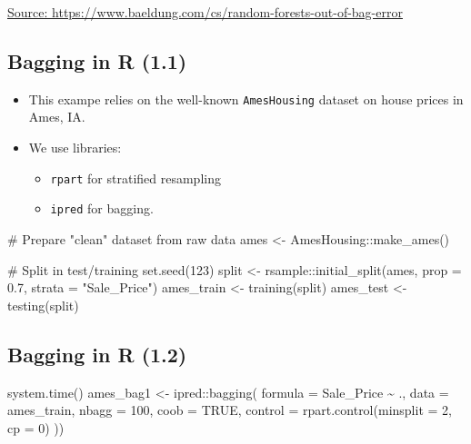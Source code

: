 \documentclass[
  letterpaper,
  DIV=11,
  numbers=noendperiod]{scrartcl}
\newenvironment{Shaded}{\begin{snugshade}}{\end{snugshade}}
\newcommand{\AttributeTok}[1]{\textcolor[rgb]{0.40,0.45,0.13}{#1}}
\newcommand{\CommentTok}[1]{\textcolor[rgb]{0.37,0.37,0.37}{#1}}
\newcommand{\ConstantTok}[1]{\textcolor[rgb]{0.56,0.35,0.01}{#1}}
\newcommand{\DecValTok}[1]{\textcolor[rgb]{0.68,0.00,0.00}{#1}}
\newcommand{\ErrorTok}[1]{\textcolor[rgb]{0.68,0.00,0.00}{#1}}
\newcommand{\FloatTok}[1]{\textcolor[rgb]{0.68,0.00,0.00}{#1}}
\newcommand{\FunctionTok}[1]{\textcolor[rgb]{0.28,0.35,0.67}{#1}}
\newcommand{\NormalTok}[1]{\textcolor[rgb]{0.00,0.23,0.31}{#1}}
\newcommand{\OtherTok}[1]{\textcolor[rgb]{0.00,0.23,0.31}{#1}}
\newcommand{\SpecialCharTok}[1]{\textcolor[rgb]{0.37,0.37,0.37}{#1}}
\newcommand{\StringTok}[1]{\textcolor[rgb]{0.13,0.47,0.30}{#1}}
\providecommand{\tightlist}{%
  \setlength{\itemsep}{0pt}\setlength{\parskip}{0pt}}\usepackage{longtable,booktabs,array}
\begin{document}
\href{https://www.baeldung.com/cs/random-forests-out-of-bag-error}{Source:
https://www.baeldung.com/cs/random-forests-out-of-bag-error}

\hypertarget{bagging-in-r-1.1}{%
\subsection{Bagging in R (1.1)}\label{bagging-in-r-1.1}}

\begin{itemize}
\item
  This exampe relies on the well-known \texttt{AmesHousing} dataset on
  house prices in Ames, IA.
\item
  We use libraries:

  \begin{itemize}
  \tightlist
  \item
    \texttt{rpart} for stratified resampling
  \item
    \texttt{ipred} for bagging.
  \end{itemize}
\end{itemize}

\begin{Shaded}
\begin{Highlighting}[]
\CommentTok{\# Prepare "clean" dataset from raw data}
\NormalTok{ames }\OtherTok{\textless{}{-}}\NormalTok{ AmesHousing}\SpecialCharTok{::}\FunctionTok{make\_ames}\NormalTok{()}

\CommentTok{\# Split in test/training}
\FunctionTok{set.seed}\NormalTok{(}\DecValTok{123}\NormalTok{)}
\NormalTok{split }\OtherTok{\textless{}{-}}\NormalTok{ rsample}\SpecialCharTok{::}\FunctionTok{initial\_split}\NormalTok{(ames, }\AttributeTok{prop =} \FloatTok{0.7}\NormalTok{, }
                       \AttributeTok{strata =} \StringTok{"Sale\_Price"}\NormalTok{)}
\NormalTok{ames\_train  }\OtherTok{\textless{}{-}} \FunctionTok{training}\NormalTok{(split)}
\NormalTok{ames\_test   }\OtherTok{\textless{}{-}} \FunctionTok{testing}\NormalTok{(split)}
\end{Highlighting}
\end{Shaded}

\hypertarget{bagging-in-r-1.2}{%
\subsection{Bagging in R (1.2)}\label{bagging-in-r-1.2}}

\begin{Shaded}
\begin{Highlighting}[]
\FunctionTok{system.time}\NormalTok{()}
\NormalTok{ames\_bag1 }\OtherTok{\textless{}{-}}\NormalTok{ ipred}\SpecialCharTok{::}\FunctionTok{bagging}\NormalTok{(}
  \AttributeTok{formula =}\NormalTok{ Sale\_Price }\SpecialCharTok{\textasciitilde{}}\NormalTok{ .,}
  \AttributeTok{data =}\NormalTok{ ames\_train,}
  \AttributeTok{nbagg =} \DecValTok{100}\NormalTok{,  }\AttributeTok{coob =} \ConstantTok{TRUE}\NormalTok{,}
  \AttributeTok{control =} \FunctionTok{rpart.control}\NormalTok{(}\AttributeTok{minsplit =} \DecValTok{2}\NormalTok{, }\AttributeTok{cp =} \DecValTok{0}\NormalTok{)}
\NormalTok{)}\ErrorTok{)}
\end{Highlighting}
\end{Shaded}
\end{document}
